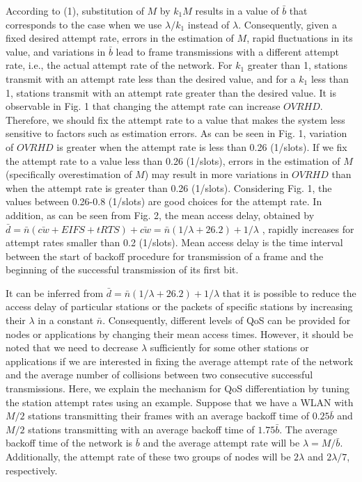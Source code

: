 \documentclass[10pt,twocolumn,oneside,submit]{JCNtran}
\begin{document}
\par According to (1), substitution of $M$ by $k_1M$ results in a value of $\bar b$ that corresponds to the case when we use $\lambda /k_1$ instead of $\lambda$. Consequently, given a fixed desired attempt rate, errors in the estimation of $M$, rapid fluctuations in its value, and variations in $\bar b$ lead to frame transmissions with a different attempt rate, i.e., the actual attempt rate of the network. For $k_1$ greater than 1, stations transmit with an attempt rate less than the desired value, and for a $k_1$ less than 1, stations transmit with an attempt rate greater than the desired value. It is observable in Fig. 1 that changing the attempt rate can increase $OVRHD$. Therefore, we should fix the attempt rate to a value that makes the system less sensitive to factors such as estimation errors. As can be seen in Fig. 1, variation of $OVRHD$ is greater when the attempt rate is less than 0.26 (1/slots). If we fix the attempt rate to a value less than 0.26 (1/slots), errors in the estimation of $M$ (specifically overestimation of $M$) may result in more variations in $OVRHD$ than when the attempt rate is greater than 0.26 (1/slots). Considering Fig. 1, the values between 0.26-0.8 (1/slots) are good choices for the attempt rate. In addition, as can be seen from Fig. 2, the mean access delay, obtained by $\bar d\!=\!\bar n(\bar {cw}+EIFS+tRTS)+\bar {cw}\!=\!\bar n(1/\lambda +26.2)+1/\lambda $ , rapidly increases for attempt rates smaller than 0.2 (1/slots). Mean access delay is the time interval between the start of backoff procedure for transmission of a frame and the beginning of the successful transmission of its first bit.
\par It can be inferred from $\bar d = \bar n(1/\lambda +26.2)+1/\lambda $ that it is possible to reduce the access delay of particular stations or the packets of specific stations by increasing their $\lambda$ in a constant $\bar n$. Consequently, different levels of QoS can be provided for nodes or applications by changing their mean access times. However, it should be noted that we need to decrease $\lambda$ sufficiently for some other stations or applications if we are interested in fixing the average attempt rate of the network and the average number of collisions between two consecutive successful transmissions. Here, we explain the mechanism for QoS differentiation by tuning the station attempt rates using an example. Suppose that we have a WLAN with $M/2$ stations transmitting their frames with an average backoff time of $0.25\bar{b}$ and $M/2$ stations transmitting with an average backoff time of $1.75\bar{b}$. The average backoff time of the network is $\bar b$ and the average attempt rate will be $\lambda =M/\bar{b}$. Additionally, the attempt rate of these two groups of nodes will be $2\lambda$ and $2\lambda/7$, respectively.
\end{document}
